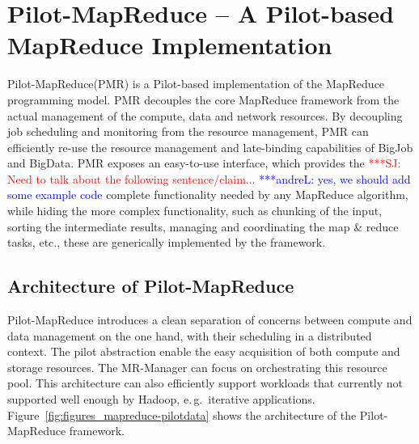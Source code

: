 \documentclass{acm_proc_article-sp}
\newcommand{\jhanote}[1]{ {\textcolor{red} { ***SJ: #1 }}}
\newcommand{\alnote}[1]{ {\textcolor{blue} { ***andreL: #1 }}}
\newcommand{\alnote}[1]{}
\newcommand{\jhanote}[1]{}
\newcommand{\upp}{\vspace*{-0.5em}}
\newcommand{\pilot}{Pilot\xspace}
\newcommand{\pilotmapreduce}{Pilot-MapReduce\xspace}
\newcommand{\mrmg}{MR-Manager\xspace}
\begin{document}
\upp
\section{Pilot-MapReduce -- A Pilot-based MapReduce Implementation}
\label{sec-pilot-mr}

  

\pilotmapreduce (PMR) is a \pilot-based implementation of the
MapReduce programming model. PMR decouples the core MapReduce
framework from the actual management of the compute, data and network
resources. By decoupling job scheduling and monitoring from the
resource management, PMR can efficiently re-use the resource
management and late-binding capabilities of BigJob and BigData. PMR
exposes an easy-to-use interface, which provides the \jhanote{Need to
  talk about the following sentence/claim...} \alnote{yes, we should
  add some example code} complete functionality needed by any
MapReduce algorithm, while hiding the more complex functionality, such
as chunking of the input, sorting the intermediate results, managing
and coordinating the map \& reduce tasks, etc., these are generically
implemented by the framework.





\upp
\subsection{Architecture of \pilotmapreduce}
\pilotmapreduce introduces a clean separation of concerns between
compute and data management on the one hand, with their scheduling in
a distributed context. The pilot abstraction enable the easy
acquisition of both compute and storage resources. The \mrmg can
focus on orchestrating this resource pool. This architecture can also
efficiently support workloads that currently not supported well
enough by Hadoop, e.\,g.\ iterative
applications. Figure~\ref{fig:figures_mapreduce-pilotdata} shows the
architecture of the \pilotmapreduce framework.
\end{document}
